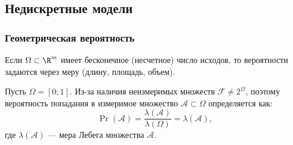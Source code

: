 \subsection{Недискретные модели}
\subsubsection{Геометрическая вероятность}

Если $\Omega \subset \R^m$ имеет бесконечное (несчетное) число исходов, то вероятности задаются через меру (длину, площадь, объем).

\begin{definition}
    Пусть $\Omega = [0; 1]$.
    Из-за наличия неизмеримых множеств $\mathcal{F} \neq 2^{\Omega}$, поэтому вероятность попадания в измеримое множество $\mathcal{A} \subset \Omega$ определяется как:
    \[
        \Pr(\mathcal{A}) = \frac{\lambda(\mathcal{A})}{\lambda(\Omega)} = \lambda(\mathcal{A}),
    \]
    где $\lambda(\mathcal{A})$ --- мера Лебега множества $\mathcal{A}$.
\end{definition}

